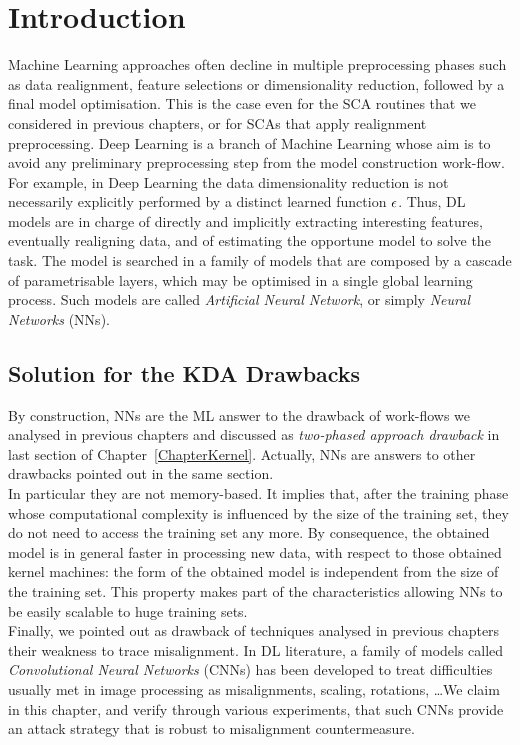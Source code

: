 \section{Introduction}
Machine Learning approaches often decline in multiple preprocessing phases such as data realignment, feature selections or dimensionality reduction, followed by a final model optimisation. This is the case even for the SCA routines that we considered in previous chapters, or for SCAs that apply realignment preprocessing. Deep Learning is a branch of Machine Learning whose aim is to avoid any preliminary preprocessing step from the model construction work-flow. For example, in Deep Learning the data dimensionality reduction is not necessarily explicitly performed by a distinct learned  function $\epsilon$. Thus, DL models are in charge of directly and implicitly extracting interesting features, eventually realigning data, and of estimating the opportune model to solve the task. The model is searched in a family of models that are composed by a cascade of parametrisable layers, which may be optimised in a single global learning process. Such models are called \emph{Artificial Neural Network}, or simply \emph{Neural Networks} (NNs). 

\subsection*{Solution for the KDA Drawbacks}
By construction, NNs are the ML answer to the drawback of work-flows we analysed in previous chapters and discussed as \emph{two-phased approach drawback} in last section of Chapter~\ref{ChapterKernel}. Actually, NNs are answers to other drawbacks pointed out in the same section. \\

In particular they are not memory-based. It implies that, after the training phase whose computational complexity is influenced by the size of the training set, they do not need to access the training set any more. By consequence, the obtained model is in general faster in processing new data, with respect to those obtained \via kernel machines: the form of the obtained model is independent from the size of the training set. This property makes part of the characteristics allowing NNs to be easily scalable to huge training sets.\\

Finally, we pointed out as drawback of techniques analysed in previous chapters their weakness to trace misalignment. In DL literature, a family of models called \emph{Convolutional Neural Networks} (CNNs) has been developed to treat difficulties usually met in image processing as misalignments, scaling, rotations, \dots We claim in this chapter, and verify through various experiments, that such CNNs provide an attack strategy that is robust to misalignment countermeasure. 

